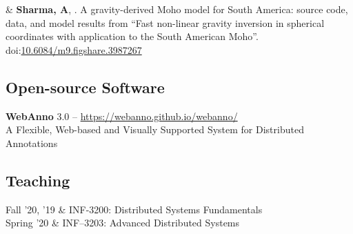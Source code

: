 \documentclass[11pt, a4paper]{article}
\newcommand{\LastName}{Sharma}
\newcommand{\Initials}{A}
\newcommand{\Me}{\textbf{\LastName, \Initials}}  %
\newcommand{\DOI}[1]{doi:\href{https://doi.org/#1}{#1}}
\newcommand{\Duration}[2]{\fontsize{10pt}{0}\selectfont #1--#2}
\newcommand{\Year}[1]{\fontsize{10pt}{0}\selectfont #1}
\begin{document}
\begin{EntriesTable}
\Year{2017}  &
    \Me, \Val.
    A gravity-derived Moho model for South America: source code, data, and
    model results from ``Fast non-linear gravity inversion in spherical
    coordinates with application to the South American Moho''.
    \DOI{10.6084/m9.figshare.3987267}
\end{EntriesTable}
\fi

\subsection*{Open-source Software}
\textbf{WebAnno} 3.0 -- \href{https://webanno.github.io/webanno/}{https://webanno.github.io/webanno/}
\\
A Flexible, Web-based and Visually Supported System for Distributed Annotations
\iffalse
\\
\textbf{osm2pgrouting} -- \href{https://github.com/aakashysharma/osm2pgrouting}{https://github.com/aakashysharma/osm2pgrouting}
\\
Import tool for OpenStreetMap data to pgRouting database including version and timestamp
\\[0.3cm]

\fi



\subsection*{Teaching}



\begin{EntriesTable}
	\Year{Fall '20, '19} &
	INF-3200: Distributed Systems Fundamentals
	\\
	\Year{Spring '20} &
	INF--3203: Advanced Distributed Systems 
\end{EntriesTable}
\end{document}
